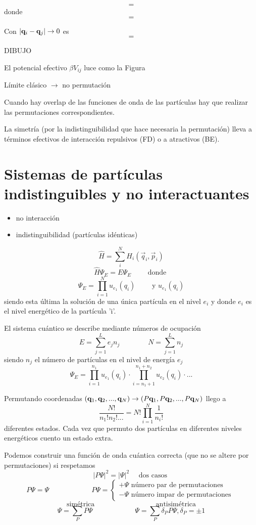 \documentclass[10pt,oneside]{CBFT_book}
\begin{document}
\[
	=
\]
donde 
\[
	=
\]

Con $ | \vb{q}_i - \vb{q}_j| \to 0 $ es
\[
	=
\]

DIBUJO 

El potencial efectivo $\beta V_{ij}$ luce como la Figura


Límite clásico $\to$ no permutación 

Cuando hay overlap de las funciones de onda de las partículas hay que realizar las permutaciones correspondientes.

La simetría (por la indistinguibilidad que hace necesaria la permutación) lleva a términos efectivos de interacción 
repulsivos (FD) o a atractivos (BE).

\section{Sistemas de partículas indistinguibles y no interactuantes}

\begin{itemize}
 \item no interacción
 \item indistinguibilidad (partículas idénticas)
\end{itemize}

\[
	\hat{H} = \sum_i^N H_i (\vec{q}_i , \vec{p}_i )
\]
\[
	\hat{H} \Psi_E = E \Psi_E \qquad \text{ donde }
\]
\[
	\Psi_E = \prod_{i=1}^{N} u_{e_1}(q_i) \qquad \text{ y } u_{e_1}(q_i)
\]
siendo esta última la solución de una única partícula en el nivel $e_i$ 
y donde $e_i$ es el nivel energético de la partícula 'i'.

El sistema cuántico se describe mediante números de ocupación
\[
	E = \sum_{j=1}^L e_j n_j  \qquad \qquad  N = \sum_{j=1}^L  n_j
\]
siendo $n_j$ el número de partículas en el nivel de energía $e_j$ 
\[
	\Psi_E = \prod_{i=1}^{n_1} u_{e_1}(q_i) \cdot \prod_{i = n_1 + 1 }^{ n_1 + n_2 } u_{e_2}(q_i) \cdot ...
\]

Permutando coordenadas $(\vb{q}_1,\vb{q}_2,...,\vb{q}_N ) \to (P\vb{q}_1,P\vb{q}_2,...,P\vb{q}_N)$ llego a
\[
	\frac{N!}{n_1!n_2!...} = N! \prod_{i=1}^N \frac{1}{n_i!}
\]
diferentes estados. Cada vez que permuto dos partículas en diferentes niveles energéticos cuento un estado extra.

Podemos construir una función de onda cuántica correcta (que no se altere por permutaciones) si respetamos
\[
	| P\Psi |^2 = | \Psi |^2 \quad \text{ dos casos }
\]
\[
	P\Psi = \Psi \qquad \qquad \qquad P\Psi = 
	\begin{cases}
	+ \Psi \text{ número par de permutaciones } \\ 
	- \Psi \text{ número impar de permutaciones } 
	\end{cases}
\]
\[
	\text{ simétrica } \qquad \qquad \qquad \qquad \text{ antisimétrica } 
\]
\[
	\Psi = \sum_P P\Psi \qquad \qquad \qquad \Psi = \sum_P \delta_P P\Psi, \delta_P = \pm 1
\]
\end{document}
